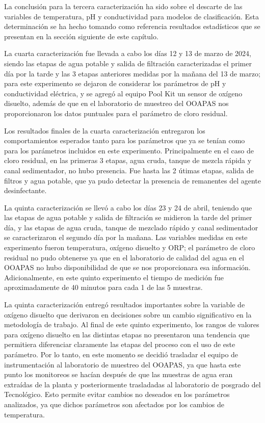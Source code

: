 La conclusión para la tercera caracterización ha sido sobre el descarte de las variables de temperatura, pH y conductividad para modelos de clasificación. Esta determinación se ha hecho tomando como referencia resultados 
estadísticos que se presentan en la sección siguiente de este capítulo.

La cuarta caracterización fue llevada a cabo los días 12 y 13 de marzo de 2024, siendo las etapas de agua potable y salida de filtración caracterizadas el primer día por la tarde y las 3 etapas anteriores medidas por la 
mañana del 13 de marzo; para este experimento se dejaron de considerar los parámetros de pH y conductividad eléctrica, y se agregó al equipo Pool Kit un sensor de oxígeno disuelto, además de que en el laboratorio de muestreo 
del OOAPAS nos proporcionaron los datos puntuales para el parámetro de cloro residual. 

Los resultados finales de la cuarta caracterización entregaron los comportamientos esperados tanto para los parámetros que ya se tenían como para los parámetros incluidos en este experimento. Principalmente en el caso de 
cloro residual, en las primeras 3 etapas, agua cruda, tanque de mezcla rápida y canal sedimentador, no hubo presencia. Fue hasta las 2 útimas etapas, salida de filtros y agua potable, que ya pudo detectar 
la presencia de remanentes del agente desinfectante.

La quinta caracterización se llevó a cabo los días 23 y 24 de abril, teniendo que las etapas de agua potable y salida de filtración se midieron la tarde del primer día, y las etapas de agua cruda, tanque de mezclado rápido 
y canal sedimentador se caracterizaron el segundo día por la mañana. Las variables medidas en este experimento fueron temperatura, oxígeno disuelto y ORP; el parámetro de cloro residual no pudo obtenerse ya que 
en el laboratorio de calidad del agua en el OOAPAS no hubo disponibilidad de que se nos proporcionara esa información. Adicionalmente, en este quinto experimento el tiempo de medición fue aproximadamente de 40 minutos para 
cada 1 de las 5 muestras.

La quinta caracterización entregó resultados importantes sobre la variable de oxígeno disuelto que derivaron en decisiones sobre un cambio significativo en la metodología de trabajo. Al final de este quinto experimento, 
los rangos de valores para oxígeno disuelto en las distintas etapas no presentaron una tendencia que permitiera diferenciar claramente las etapas del proceso con el uso de este parámetro. Por lo tanto, en este momento se decidió 
trasladar el equipo de instrumentación al laboratorio de muestreo del OOAPAS, ya que hasta este punto los monitoreos se hacían después de que las muestras de agua eran extraídas 
de la planta y posteriormente trasladadas al laboratorio de posgrado del Tecnológico. Esto permite evitar cambios no deseados en los parámetros analizados, ya que dichos parámetros son afectados por los cambios de 
temperatura.


